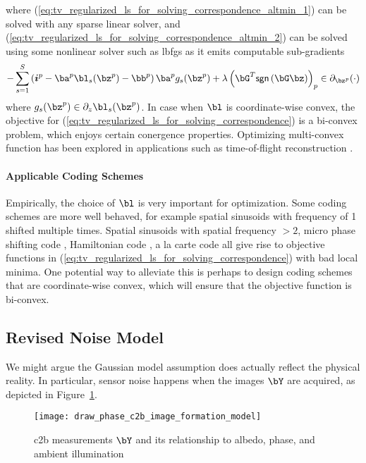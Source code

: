 \documentclass[../writeup.tex]{subfiles}
\begin{document}
where (\ref{eq:tv_regularized_ls_for_solving_correspondence_altmin_1}) can be solved with any sparse linear solver, and (\ref{eq:tv_regularized_ls_for_solving_correspondence_altmin_2}) can be solved using some nonlinear solver such as lbfgs as it emits computable sub-gradients 
\begin{align}
     -\sum_{s=1}^S 
            \left( \si^p - \ba^p \bl_s(\bz^p) - \bb^p \right) \ba^p g_s(\bz^p)
            + \lambda \left( \bG^T \textsf{sgn}\left( \bG \bz \right) \right)_p
        \in \partial_{\bz^p}(\cdot)
    \label{eq:tv_regularized_ls_for_solving_correspondence_altmin_1_gradient}
\end{align}
where $g_s(\bz^p) \in \partial_{z}\bl_s(\bz^p)$. In case when $\bl$ is coordinate-wise convex, the objective for (\ref{eq:tv_regularized_ls_for_solving_correspondence}) is a bi-convex problem, which enjoys certain conergence properties. Optimizing multi-convex function has been explored in applications such as time-of-flight reconstruction \cite{heideNonlineofsightImagingPartial2017}. 

\paragraph{Applicable Coding Schemes}

Empirically, the choice of $\bl$ is very important for optimization. Some coding schemes are more well behaved, for example spatial sinusoids with frequency of 1 shifted multiple times. Spatial sinusoids with spatial frequency $> 2$, micro phase shifting code \cite{guptaMicroPhaseShifting2012}, Hamiltonian code \cite{guptaGeometricPerspectiveStructured2018}, a la carte code \cite{mirdehghanOptimalStructuredLight2018} all give rise to objective functions in (\ref{eq:tv_regularized_ls_for_solving_correspondence}) with bad local minima. One potential way to alleviate this is perhaps to design coding schemes that are coordinate-wise convex, which will ensure that the objective function is bi-convex.


\subsection{Revised Noise Model}
We might argue the Gaussian model assumption does actually reflect the physical reality. In particular, sensor noise happens when the images $\bY$ are acquired, as depicted in Figure~\ref{fig:draw_phase_c2b_image_formation_model}.


\begin{figure}[h!]
    \begin{center}
        \texttt{[image: draw\_phase\_c2b\_image\_formation\_model]}
        \caption{c2b measurements $\bY$ and its relationship to albedo, phase, and ambient illumination}
        \label{fig:draw_phase_c2b_image_formation_model}
    \end{center}
\end{figure}  
\end{document}
